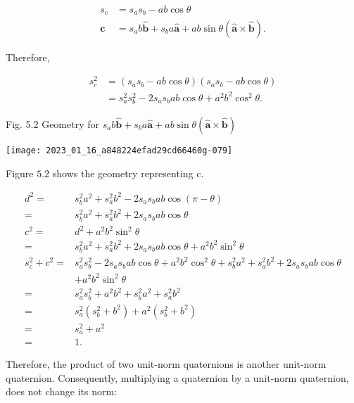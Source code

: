 $$
\begin{aligned}
s_{c} & =s_{a} s_{b}-a b \cos \theta \\
\mathbf{c} & =s_{a} b \hat{\mathbf{b}}+s_{b} a \hat{\mathbf{a}}+a b \sin \theta(\hat{\mathbf{a}} \times \hat{\mathbf{b}}) .
\end{aligned}
$$

Therefore,

$$
\begin{aligned}
s_{c}^{2} & =\left(s_{a} s_{b}-a b \cos \theta\right)\left(s_{a} s_{b}-a b \cos \theta\right) \\
& =s_{a}^{2} s_{b}^{2}-2 s_{a} s_{b} a b \cos \theta+a^{2} b^{2} \cos ^{2} \theta .
\end{aligned}
$$

Fig. 5.2 Geometry for $s_{a} b \hat{\mathbf{b}}+s_{b} a \hat{\mathbf{a}}+a b \sin \theta(\hat{\mathbf{a}} \times \hat{\mathbf{b}})$

\begin{center}
\texttt{[image: 2023\_01\_16\_a848224efad29cd66460g-079]}
\end{center}

Figure $5.2$ shows the geometry representing c.

$$
\begin{aligned}
d^{2}= & s_{b}^{2} a^{2}+s_{a}^{2} b^{2}-2 s_{a} s_{b} a b \cos (\pi-\theta) \\
= & s_{b}^{2} a^{2}+s_{a}^{2} b^{2}+2 s_{a} s_{b} a b \cos \theta \\
c^{2}= & d^{2}+a^{2} b^{2} \sin ^{2} \theta \\
= & s_{b}^{2} a^{2}+s_{a}^{2} b^{2}+2 s_{a} s_{b} a b \cos \theta+a^{2} b^{2} \sin ^{2} \theta \\
s_{c}^{2}+c^{2}= & s_{a}^{2} s_{b}^{2}-2 s_{a} s_{b} a b \cos \theta+a^{2} b^{2} \cos ^{2} \theta+s_{b}^{2} a^{2}+s_{a}^{2} b^{2}+2 s_{a} s_{b} a b \cos \theta \\
& +a^{2} b^{2} \sin ^{2} \theta \\
= & s_{a}^{2} s_{b}^{2}+a^{2} b^{2}+s_{b}^{2} a^{2}+s_{a}^{2} b^{2} \\
= & s_{a}^{2}\left(s_{b}^{2}+b^{2}\right)+a^{2}\left(s_{b}^{2}+b^{2}\right) \\
= & s_{a}^{2}+a^{2} \\
= & 1 .
\end{aligned}
$$

Therefore, the product of two unit-norm quaternions is another unit-norm quaternion. Consequently, multiplying a quaternion by a unit-norm quaternion, does not change its norm:

